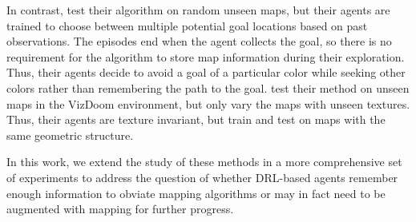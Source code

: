 In contrast, \cite{OhChSiICML2016} test their algorithm on random unseen maps, but their agents are trained to choose between multiple potential goal locations based on past observations.
The episodes end when the agent collects the goal, so there is no requirement for the algorithm to store map information during their exploration.
Thus, their agents decide to avoid a goal of a particular color while seeking other colors rather than remembering the path to the goal.
\cite{ChLaSaNIPS2016} test their method on unseen maps in the VizDoom environment, but only vary the maps with unseen textures. Thus, their agents are texture invariant, but train and test on maps with the same geometric structure.
%

In this work, we extend the study of these methods in a more comprehensive set of experiments to address the question of whether DRL-based agents remember enough information to obviate mapping algorithms or may in fact need to be augmented with mapping for further progress.
 
